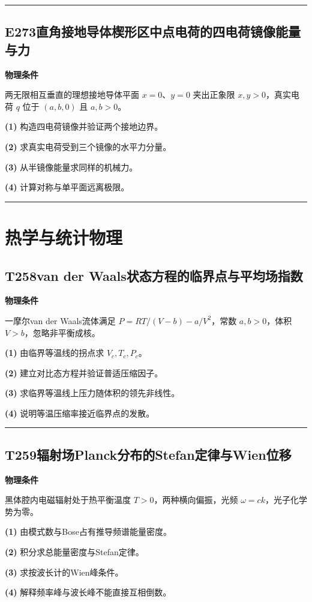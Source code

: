 \documentclass[UTF8,a4paper,11pt,oneside,openany]{ctexbook}
\begin{document}
\par\bigskip\hrule\bigskip
\section*{E273\quad 直角接地导体楔形区中点电荷的四电荷镜像能量与力}
\textbf{物理条件}\par 两无限相互垂直的理想接地导体平面 \(x=0\)、\(y=0\) 夹出正象限 \(x,y>0\)，真实电荷 \(q\) 位于 \((a,b,0)\) 且 \(a,b>0\)。
\par\noindent\textbf{(1)} 构造四电荷镜像并验证两个接地边界。
\par\noindent\textbf{(2)} 求真实电荷受到三个镜像的水平力分量。
\par\noindent\textbf{(3)} 从半镜像能量求同样的机械力。
\par\noindent\textbf{(4)} 计算对称与单平面远离极限。

\par\bigskip\hrule\bigskip
\chapter{热学与统计物理}
\section*{T258\quad van der Waals状态方程的临界点与平均场指数}
\textbf{物理条件}\par 一摩尔van der Waals流体满足 \(P=RT/(V-b)-a/V^2\)，常数 \(a,b>0\)，体积 \(V>b\)，忽略非平衡成核。
\par\noindent\textbf{(1)} 由临界等温线的拐点求 \(V_c,T_c,P_c\)。
\par\noindent\textbf{(2)} 建立对比态方程并验证普适压缩因子。
\par\noindent\textbf{(3)} 求临界等温线上压力随体积的领先非线性。
\par\noindent\textbf{(4)} 说明等温压缩率接近临界点的发散。

\par\bigskip\hrule\bigskip
\section*{T259\quad 辐射场Planck分布的Stefan定律与Wien位移}
\textbf{物理条件}\par 黑体腔内电磁辐射处于热平衡温度 \(T>0\)，两种横向偏振，光频 \(\omega=ck\)，光子化学势为零。
\par\noindent\textbf{(1)} 由模式数与Bose占有推导频谱能量密度。
\par\noindent\textbf{(2)} 积分求总能量密度与Stefan定律。
\par\noindent\textbf{(3)} 求按波长计的Wien峰条件。
\par\noindent\textbf{(4)} 解释频率峰与波长峰不能直接互相倒数。
\end{document}
